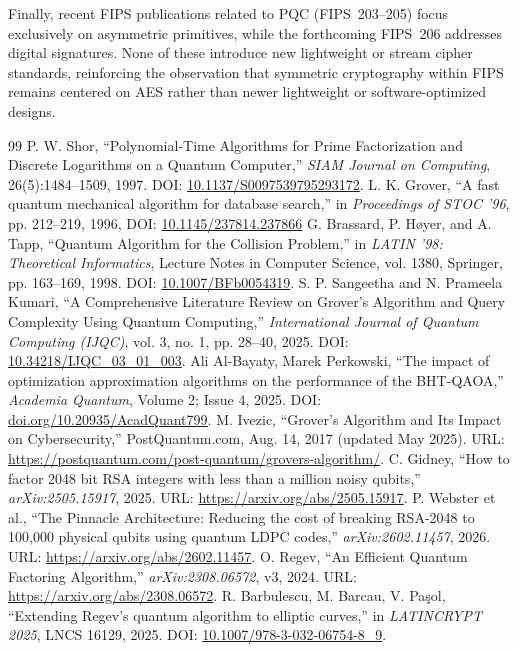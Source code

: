 \documentclass[11pt,a4paper]{article}
\begin{document}
Finally, recent FIPS publications related to PQC (FIPS~203--205) focus exclusively on asymmetric primitives, while the forthcoming FIPS~206 addresses digital signatures. None of these introduce new lightweight or stream cipher standards, reinforcing the observation that symmetric cryptography within FIPS remains centered on AES rather than newer lightweight or software-optimized designs.
\begin{thebibliography}{99}
 P. W. Shor, ``Polynomial-Time Algorithms for Prime Factorization and Discrete Logarithms on a Quantum Computer,'' \emph{SIAM Journal on Computing}, 26(5):1484--1509, 1997. DOI:  \href{https://doi.org/10.1137/S0097539795293172}{10.1137/S0097539795293172}.
 L. K. Grover, ``A fast quantum mechanical algorithm for database search,'' in \emph{Proceedings of STOC '96}, pp. 212--219, 1996, DOI: \href{https://dl.acm.org/doi/10.1145/237814.237866}{10.1145/237814.237866}
G. Brassard, P. Høyer, and A. Tapp,
``Quantum Algorithm for the Collision Problem,''
in \emph{LATIN '98: Theoretical Informatics}, 
Lecture Notes in Computer Science, vol. 1380, 
Springer, pp. 163--169, 1998. 
DOI: \href{https://link.springer.com/chapter/10.1007/BFb0054319}{10.1007/BFb0054319}.
S. P. Sangeetha and N. Prameela Kumari,
``A Comprehensive Literature Review on Grover’s Algorithm and Query Complexity Using Quantum Computing,''
\emph{International Journal of Quantum Computing (IJQC)}, 
vol. 3, no. 1, pp. 28--40, 2025.
DOI: \href{https://doi.org/10.34218/IJQC_03_01_003}{10.34218/IJQC\_03\_01\_003}.
Ali Al-Bayaty, Marek Perkowski,
``The impact of optimization approximation algorithms on the performance of the BHT-QAOA,''
\emph{Academia Quantum}, 
Volume 2; Issue 4, 2025.
DOI: \href{https://www.doi.org/10.20935/AcadQuant7996}{doi.org/10.20935/AcadQuant799}.
M. Ivezic, ``Grover’s Algorithm and Its Impact on Cybersecurity,''
PostQuantum.com, Aug. 14, 2017 (updated May 2025). 
URL: \url{https://postquantum.com/post-quantum/grovers-algorithm/}.
 C. Gidney, ``How to factor 2048 bit RSA integers with less than a million noisy qubits,'' \emph{arXiv:2505.15917}, 2025. URL: \url{https://arxiv.org/abs/2505.15917}.
 P. Webster et al., ``The Pinnacle Architecture: Reducing the cost of breaking RSA-2048 to 100{,}000 physical qubits using quantum LDPC codes,'' \emph{arXiv:2602.11457}, 2026. URL: \url{https://arxiv.org/abs/2602.11457}.
 O. Regev, ``An Efficient Quantum Factoring Algorithm,'' \emph{arXiv:2308.06572}, v3, 2024. URL: \url{https://arxiv.org/abs/2308.06572}.
 R. Barbulescu, M. Barcau, V. Pa\c{s}ol, ``Extending Regev’s quantum algorithm to elliptic curves,'' in \emph{LATINCRYPT 2025}, LNCS 16129, 2025. DOI: \href{https://dl.acm.org/doi/abs/10.1007/978-3-032-06754-8_9}{10.1007/978-3-032-06754-8\_9}.


\end{thebibliography}
\end{document}
